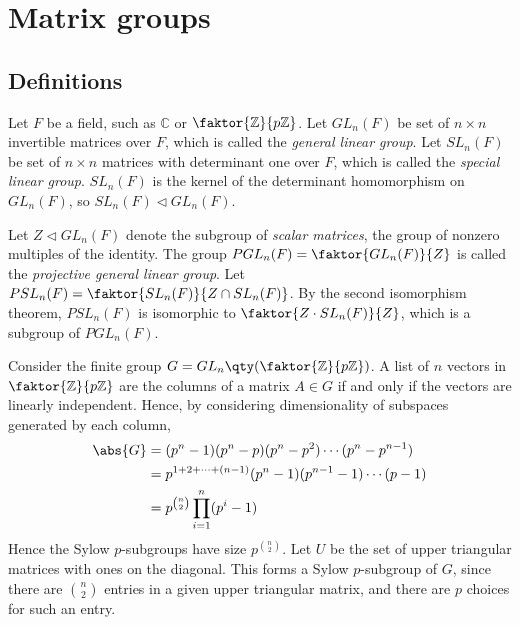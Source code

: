 \section{Matrix groups}

\subsection{Definitions}
\begin{definition}
	Let $F$ be a field, such as $\mathbb C$ or $\faktor{\mathbb Z}{p \mathbb Z}$.
	Let $GL_n(F)$ be set of $n \times n$ invertible matrices over $F$, which is called the \textit{general linear group}.
	Let $SL_n(F)$ be set of $n \times n$ matrices with determinant one over $F$, which is called the \textit{special linear group}.
	$SL_n(F)$ is the kernel of the determinant homomorphism on $GL_n(F)$, so $SL_n(F) \triangleleft GL_n(F)$.

	Let $Z \triangleleft GL_n(F)$ denote the subgroup of \textit{scalar matrices}, the group of nonzero multiples of the identity.
	The group $PGL_n(F) = \faktor{GL_n(F)}{Z}$ is called the \textit{projective general linear group}.
	Let $PSL_n(F) = \faktor{SL_n(F)}{Z \cap SL_n(F)}$.
	By the second isomorphism theorem, $PSL_n(F)$ is isomorphic to $\faktor{Z \cdot SL_n(F)}{Z}$, which is a subgroup of $PGL_n(F)$.
\end{definition}
\begin{example}
	Consider the finite group $G = GL_n\qty(\faktor{\mathbb Z}{p\mathbb Z})$.
	A list of $n$ vectors in $\faktor{\mathbb Z}{p\mathbb Z}$ are the columns of a matrix $A \in G$ if and only if the vectors are linearly independent.
	Hence, by considering dimensionality of subspaces generated by each column,
	\begin{align*}
		\abs{G} & = (p^n - 1)(p^n - p)(p^n - p^2) \cdots (p^n - p^{n-1})      \\
		        & = p^{1+2+\dots+(n-1)} (p^n - 1)(p^{n-1} - 1) \cdots (p - 1) \\
		        & = p^{\binom{n}{2}} \prod_{i=1}^n (p^i - 1)
	\end{align*}
	Hence the Sylow $p$-subgroups have size $p^{\binom{n}{2}}$.
	Let $U$ be the set of upper triangular matrices with ones on the diagonal.
	This forms a Sylow $p$-subgroup of $G$, since there are $\binom{n}{2}$ entries in a given upper triangular matrix, and there are $p$ choices for such an entry.
\end{example}

